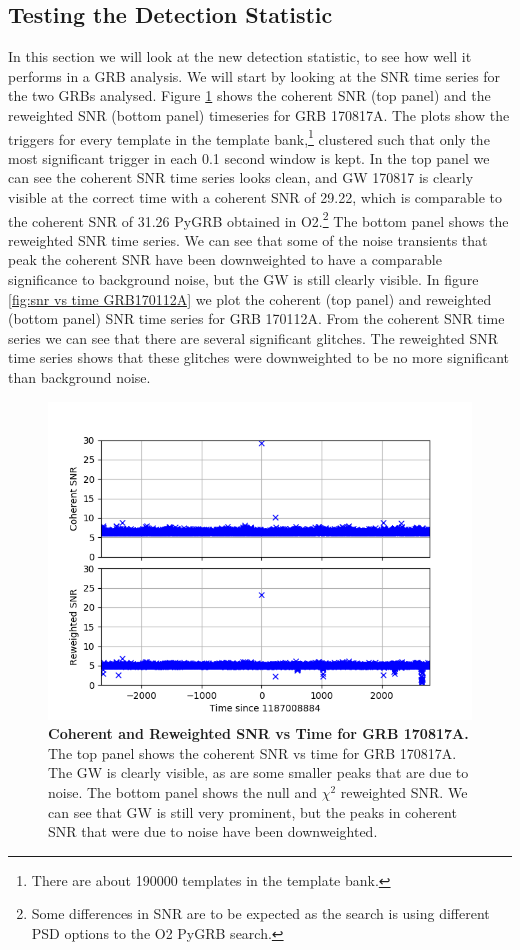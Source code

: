 \documentclass[11pt]{cuthesis}
\begin{document}
\subsection{Testing the Detection Statistic}
In this section we will look at the new detection statistic, to see how well it performs in a GRB analysis. We will start by looking at the SNR time series for the two GRBs analysed. Figure \ref{fig:snr vs time 170817} shows the coherent SNR (top panel) and the reweighted SNR (bottom panel) timeseries for GRB 170817A. The plots show the triggers for every template in the template bank,\footnote{There are about 190000 templates in the template bank.} clustered such that only the most significant trigger in each 0.1 second window is kept. In the top panel we can see the coherent SNR time series looks clean, and GW 170817 is clearly visible at the correct time with a coherent SNR of 29.22, which is comparable to the coherent SNR of 31.26 PyGRB obtained in O2.\footnote{Some differences in SNR are to be expected as the search is using different PSD options to the O2 PyGRB search.} The bottom panel shows the reweighted SNR time series. We can see that some of the noise transients that peak the coherent SNR have been downweighted to have a comparable significance to background noise, but the GW is still clearly visible. In figure \ref{fig:snr vs time GRB170112A} we plot the coherent (top panel) and reweighted (bottom panel) SNR time series for GRB 170112A. From the coherent SNR time series we can see that there are several significant glitches. The reweighted SNR time series shows that these glitches were downweighted to be no more significant than background noise. 

\begin{figure} %
\begin{center}
\includegraphics[width=0.8\linewidth]{network_snrs_vs_time_170817.png}
\end{center}
\caption{\textbf{Coherent and Reweighted SNR vs Time for GRB 170817A.} The top panel shows the coherent SNR vs time for GRB 170817A. The GW is clearly visible, as are some smaller peaks that are due to noise. The bottom panel shows the null and $\chi^2$ reweighted SNR. We can see that GW is still very prominent, but the peaks in coherent SNR that were due to noise have been downweighted.} 
\label{fig:snr vs time 170817}
\end{figure}
\end{document}
